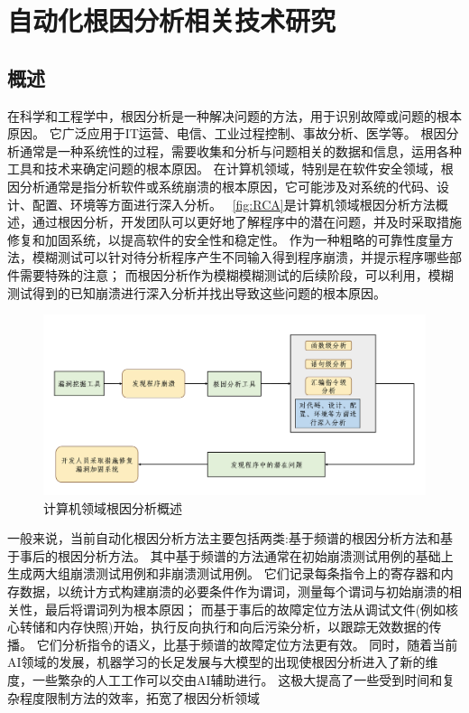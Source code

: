 


\section{自动化根因分析相关技术研究}        %
\subsection{概述}
在科学和工程学中，根因分析是一种解决问题的方法，用于识别故障或问题的根本原因。
它广泛应用于IT运营、电信、工业过程控制、事故分析、医学等。
根因分析通常是一种系统性的过程，需要收集和分析与问题相关的数据和信息，运用各种工具和技术来确定问题的根本原因。
在计算机领域，特别是在软件安全领域，根因分析通常是指分析软件或系统崩溃的根本原因，它可能涉及对系统的代码、设计、配置、环境等方面进行深入分析。
~\autoref{fig:RCA}是计算机领域根因分析方法概述，通过根因分析，开发团队可以更好地了解程序中的潜在问题，并及时采取措施修复和加固系统，以提高软件的安全性和稳定性。
作为一种粗略的可靠性度量方法，模糊测试可以针对待分析程序产生不同输入得到程序崩溃，并提示程序哪些部件需要特殊的注意；
而根因分析作为模糊模糊测试的后续阶段，可以利用，模糊测试得到的已知崩溃进行深入分析并找出导致这些问题的根本原因。
\begin{figure}[h]
    \centering
    \includegraphics[width=1.0\textwidth]{./figure/RCA.png}
    \caption{计算机领域根因分析概述}
    \label{fig:RCA}
\end{figure}

一般来说，当前自动化根因分析方法主要包括两类:基于频谱的根因分析方法和基于事后的根因分析方法。
其中基于频谱的方法通常在初始崩溃测试用例的基础上生成两大组崩溃测试用例和非崩溃测试用例。
它们记录每条指令上的寄存器和内存数据，以统计方式构建崩溃的必要条件作为谓词，测量每个谓词与初始崩溃的相关性，最后将谓词列为根本原因；
而基于事后的故障定位方法从调试文件(例如核心转储和内存快照)开始，执行反向执行和向后污染分析，以跟踪无效数据的传播。
它们分析指令的语义，比基于频谱的故障定位方法更有效。
同时，随着当前AI领域的发展，机器学习的长足发展与大模型的出现使根因分析进入了新的维度，一些繁杂的人工工作可以交由AI辅助进行。
这极大提高了一些受到时间和复杂程度限制方法的效率，拓宽了根因分析领域

